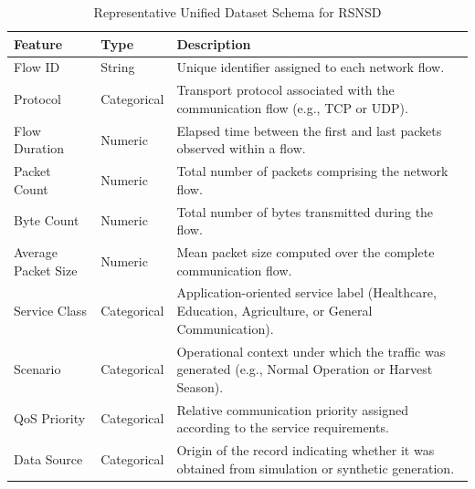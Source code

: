 \documentclass[12pt,a4paper]{report}
\begin{document}
	
	\begin{table}[H]
		\centering
		\caption{Representative Unified Dataset Schema for RSNSD}
		\label{tab:schema}
		
		\begin{tabular}{|p{4cm}|p{2.5cm}|p{8cm}|}
			\hline
			
			\textbf{Feature} &
			\textbf{Type} &
			\textbf{Description}
			\\
			\hline
			
			Flow ID &
			String &
			Unique identifier assigned to each network flow.
			\\
			\hline
			
			Protocol &
			Categorical &
			Transport protocol associated with the communication flow (e.g., TCP or UDP).
			\\
			\hline
			
			Flow Duration &
			Numeric &
			Elapsed time between the first and last packets observed within a flow.
			\\
			\hline
			
			Packet Count &
			Numeric &
			Total number of packets comprising the network flow.
			\\
			\hline
			
			Byte Count &
			Numeric &
			Total number of bytes transmitted during the flow.
			\\
			\hline
			
			Average Packet Size &
			Numeric &
			Mean packet size computed over the complete communication flow.
			\\
			\hline
			
			Service Class &
			Categorical &
			Application-oriented service label (Healthcare, Education, Agriculture, or General Communication).
			\\
			\hline
			
			Scenario &
			Categorical &
			Operational context under which the traffic was generated (e.g., Normal Operation or Harvest Season).
			\\
			\hline
			
			QoS Priority &
			Categorical &
			Relative communication priority assigned according to the service requirements.
			\\
			\hline
			
			Data Source &
			Categorical &
			Origin of the record indicating whether it was obtained from simulation or synthetic generation.
			\\
			\hline
			
		\end{tabular}
		
	\end{table}
	
\end{document}
